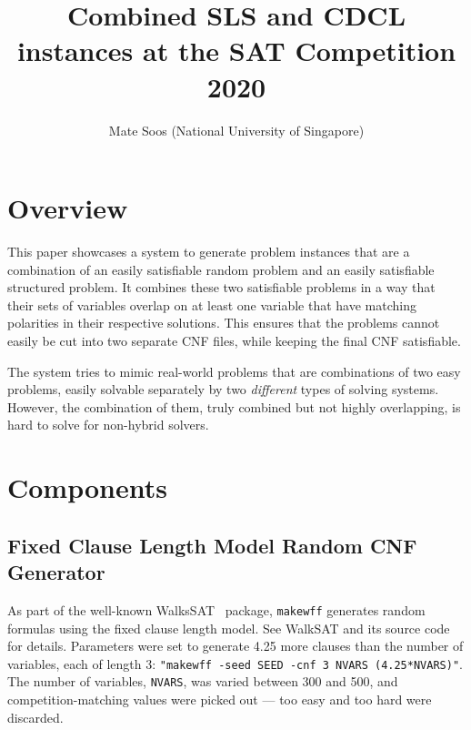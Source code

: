 \documentclass[final]{ieee}
\begin{document}
\title{Combined SLS and CDCL instances at the SAT Competition 2020}
\author{Mate Soos (National University of Singapore)}

\maketitle
\thispagestyle{empty}
\pagestyle{empty}



\section{Overview}
This paper showcases a system to generate problem instances that are a combination of an easily satisfiable random problem and an easily satisfiable structured problem. It combines these two satisfiable problems in a way that their sets of variables overlap on at least one variable that have matching polarities in their respective solutions. This ensures that the problems cannot easily be cut into two separate CNF files, while keeping the final CNF satisfiable.

The system tries to mimic real-world problems that are combinations of two easy problems, easily solvable separately by two \emph{different} types of solving systems. However, the combination of them, truly combined but not highly overlapping, is hard to solve for non-hybrid solvers.


\section{Components}


\subsection{Fixed Clause Length Model Random CNF Generator}
As part of the well-known WalksSAT~\cite{Selman95localsearch} package, \texttt{makewff} generates random formulas using the fixed clause length model. See WalkSAT and its source code for details. Parameters were set to generate 4.25 more clauses than the number of variables, each of length 3:  \texttt{"makewff -seed SEED -cnf 3 NVARS (4.25*NVARS)"}. The number of variables, \texttt{NVARS}, was varied between 300 and 500, and competition-matching values were picked out --- too easy and too hard were discarded.
\end{document}
